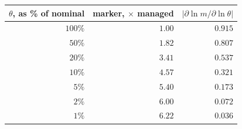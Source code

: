 \begin{tabular}{@{}rrr@{}}
\toprule
\textbf{$\theta$, as \% of nominal} & \textbf{marker, $\times$ managed} & \textbf{$\lvert\partial\ln m/\partial\ln\theta\rvert$} \\
\midrule
$100\%$ & $1.00$ & $0.915$ \\
$50\%$ & $1.82$ & $0.807$ \\
$20\%$ & $3.41$ & $0.537$ \\
$10\%$ & $4.57$ & $0.321$ \\
$5\%$ & $5.40$ & $0.173$ \\
$2\%$ & $6.00$ & $0.072$ \\
$1\%$ & $6.22$ & $0.036$ \\
\bottomrule
\end{tabular}
